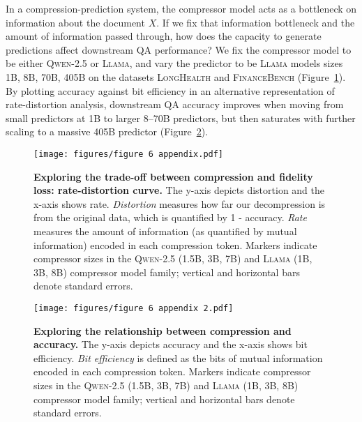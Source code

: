 \documentclass{article} %
\begin{document}
In a compression-prediction system, the compressor model acts as a bottleneck on information about the document $X$. If we fix that information bottleneck and the amount of information passed through, how does the capacity to generate predictions affect downstream QA performance? We fix the compressor model to be either \textsc{Qwen-2.5} or \textsc{Llama}, and vary the predictor to be \textsc{Llama} models sizes 1B, 8B, 70B, 405B on the datasets \textsc{LongHealth} and \textsc{FinanceBench} (Figure~\ref{fig:figure-6-appendix}). By plotting accuracy against bit efficiency in an alternative representation of rate-distortion analysis, downstream QA accuracy improves when moving from small predictors at 1B to larger 8--70B predictors, but then saturates with further scaling to a massive 405B predictor (Figure~\ref{fig:figure-6-appendix-2}). 

\begin{figure}[h!]
    \centering
    \texttt{[image: figures/figure 6 appendix.pdf]}
    \caption{\textbf{Exploring the trade-off between compression and fidelity loss: rate-distortion curve.} The y-axis depicts distortion and the x-axis shows rate. \textit{Distortion} measures how far our decompression is from the original data, which is quantified by 1 - accuracy. \textit{Rate} measures the amount of information (as quantified by mutual information) encoded in each compression token. Markers indicate compressor sizes in the \textsc{Qwen-2.5} (1.5B, 3B, 7B) and \textsc{Llama} (1B, 3B, 8B)  compressor model family; vertical and horizontal bars denote standard errors.}
    \label{fig:figure-6-appendix}
\end{figure}

\begin{figure}[h!]
    \centering
    \texttt{[image: figures/figure 6 appendix 2.pdf]}
    \caption{\textbf{Exploring the relationship between compression and accuracy.} The y-axis depicts accuracy and the x-axis shows bit efficiency. \textit{Bit efficiency} is defined as the bits of mutual information encoded in each compression token. Markers indicate compressor sizes in the \textsc{Qwen-2.5} (1.5B, 3B, 7B) and \textsc{Llama} (1B, 3B, 8B)  compressor model family; vertical and horizontal bars denote standard errors.}
    \label{fig:figure-6-appendix-2}
\end{figure}
\end{document}
